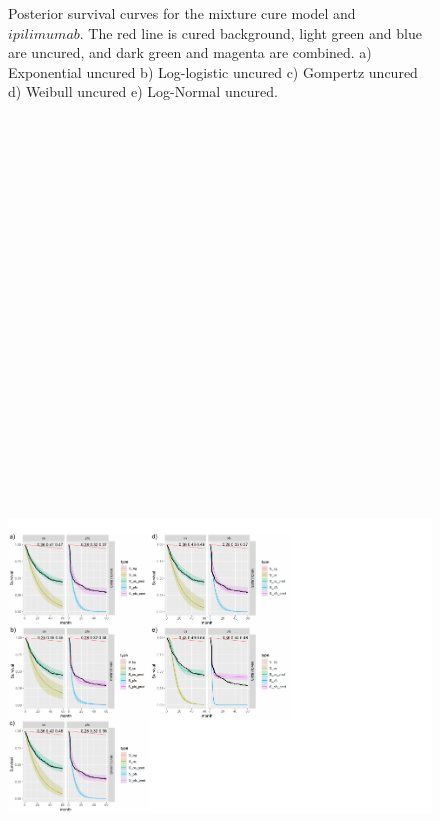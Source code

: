 \documentclass[
]{article}
\begin{document}
\begin{figure}
{}

\caption{\label{fig:IPI}Posterior survival curves for the mixture cure model and $ipilimumab$. The red line is cured background, light green and blue are uncured, and dark green and magenta are combined. a) Exponential uncured b) Log-logistic uncured c) Gompertz uncured d) Weibull uncured e) Log-Normal uncured.}\label{fig:unnamed-chunk-3}
\end{figure}

\begin{figure}

{\centering \includegraphics[width=25cm,height=40cm]{Check_mate_analysis_files/figure-latex/unnamed-chunk-4-1} 

}
\end{figure}
\end{document}
